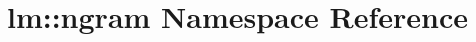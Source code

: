 \hypertarget{namespacelm_1_1ngram}{}\section{lm\+:\+:ngram Namespace Reference}
\label{namespacelm_1_1ngram}
